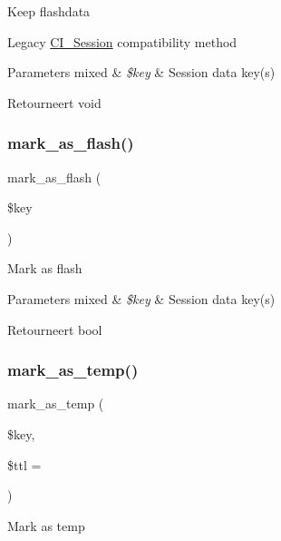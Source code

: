 Keep flashdata

Legacy \mbox{\hyperlink{class_c_i___session}{C\+I\+\_\+\+Session}} compatibility method


\begin{DoxyParams}[1]{Parameters}
mixed & {\em \$key} & Session data key(s) \\
\hline
\end{DoxyParams}
\begin{DoxyReturn}{Retourneert}
void 
\end{DoxyReturn}
\mbox{\label{class_c_i___session_a81fdbc2498fc26532aee037f03dbaf55}} 
\subsubsection{\texorpdfstring{mark\_as\_flash()}{mark\_as\_flash()}}
{\footnotesize\ttfamily mark\+\_\+as\+\_\+flash (\begin{DoxyParamCaption}\item[{}]{\$key }\end{DoxyParamCaption})}

Mark as flash


\begin{DoxyParams}[1]{Parameters}
mixed & {\em \$key} & Session data key(s) \\
\hline
\end{DoxyParams}
\begin{DoxyReturn}{Retourneert}
bool 
\end{DoxyReturn}
\mbox{\label{class_c_i___session_ab55f3c6806c359d98edd6138ef33ecf0}} 
\subsubsection{\texorpdfstring{mark\_as\_temp()}{mark\_as\_temp()}}
{\footnotesize\ttfamily mark\+\_\+as\+\_\+temp (\begin{DoxyParamCaption}\item[{}]{\$key,  }\item[{}]{\$ttl = {} }\end{DoxyParamCaption})}

Mark as temp


